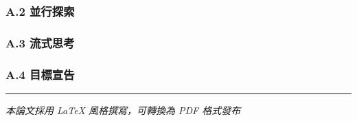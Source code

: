 \subsubsection{A.2 並行探索}\label{a.2-ux4e26ux884cux63a2ux7d22}

\begin{Shaded}
\begin{Highlighting}[]
\OperatorTok{=} \NormalTok{ explore([}
\NormalTok{])}
\end{Highlighting}
\end{Shaded}

\subsubsection{A.3 流式思考}\label{a.3-ux6d41ux5f0fux601dux8003}

\begin{Shaded}
\begin{Highlighting}[]
\NormalTok{) }\OperatorTok{\textbackslash{}}
\NormalTok{) }\OperatorTok{\textbackslash{}}
\NormalTok{) }\OperatorTok{\textbackslash{}}
\NormalTok{)}
\end{Highlighting}
\end{Shaded}

\subsubsection{A.4 目標宣告}\label{a.4-ux76eeux6a19ux5ba3ux544a}

\begin{Shaded}
\begin{Highlighting}[]
\NormalTok{()}
 
     
\end{Highlighting}
\end{Shaded}

\begin{center}\rule{0.5\linewidth}{0.5pt}\end{center}

\emph{本論文採用 LaTeX 風格撰寫，可轉換為 PDF 格式發布}

